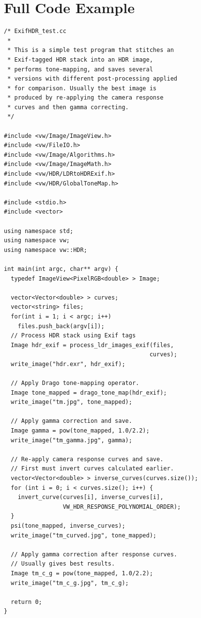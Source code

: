 \section{Full Code Example}
\begin{verbatim}
/* ExifHDR_test.cc
 * 
 * This is a simple test program that stitches an
 * Exif-tagged HDR stack into an HDR image,
 * performs tone-mapping, and saves several
 * versions with different post-processing applied
 * for comparison. Usually the best image is
 * produced by re-applying the camera response
 * curves and then gamma correcting.
 */

#include <vw/Image/ImageView.h>
#include <vw/FileIO.h>
#include <vw/Image/Algorithms.h>
#include <vw/Image/ImageMath.h>
#include <vw/HDR/LDRtoHDRExif.h>
#include <vw/HDR/GlobalToneMap.h>

#include <stdio.h>
#include <vector>

using namespace std;
using namespace vw;
using namespace vw::HDR;

int main(int argc, char** argv) {
  typedef ImageView<PixelRGB<double> > Image;

  vector<Vector<double> > curves;
  vector<string> files;
  for(int i = 1; i < argc; i++)
    files.push_back(argv[i]);
  // Process HDR stack using Exif tags
  Image hdr_exif = process_ldr_images_exif(files,
                                          curves);
  write_image("hdr.exr", hdr_exif);

  // Apply Drago tone-mapping operator.
  Image tone_mapped = drago_tone_map(hdr_exif);
  write_image("tm.jpg", tone_mapped);

  // Apply gamma correction and save.
  Image gamma = pow(tone_mapped, 1.0/2.2);
  write_image("tm_gamma.jpg", gamma);

  // Re-apply camera response curves and save.
  // First must invert curves calculated earlier.
  vector<Vector<double> > inverse_curves(curves.size());
  for (int i = 0; i < curves.size(); i++) {
    invert_curve(curves[i], inverse_curves[i],
                 VW_HDR_RESPONSE_POLYNOMIAL_ORDER);
  }
  psi(tone_mapped, inverse_curves);
  write_image("tm_curved.jpg", tone_mapped);

  // Apply gamma correction after response curves.
  // Usually gives best results.
  Image tm_c_g = pow(tone_mapped, 1.0/2.2);
  write_image("tm_c_g.jpg", tm_c_g);  

  return 0;
}
\end{verbatim}

